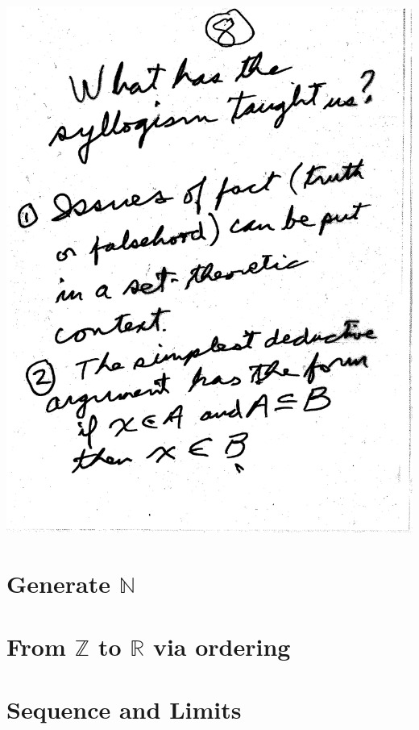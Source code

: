 \documentclass[10pt,a4paper]{article}
\begin{document}
\includegraphics[scale=.5]{Pages/ST_8}





\section{Generate $\mathbb{N}$}






\section{From $\mathbb{Z}$ to $\mathbb{R}$ via ordering}




\section{Sequence and Limits}
\end{document}
